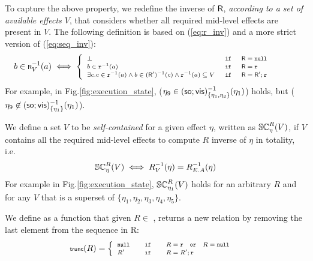 To capture the above property, we redefine the 
inverse of ${\normalfont \textsf{R}}$, \emph{according to a set of available effects $V$}, 
that considers whether all required mid-level effects are present in $V$.
The following definition is based on (\ref{eq:r_inv}) and a more
strict version of (\ref{eq:seq_inv}):
\begin{equation}
\label{eq:R_inv}
\scriptsize
b \in {\normalfont \textsf{R}}^{-1}_V(a) \iff
\begin{cases}
\begin{array} {lllll} 
\bot & \;\mathtt {if}\; & {\normalfont \textsf{R}} = \mathtt{null}& & \\
b \in \mathtt{r}^{-1}(a) & \;\mathtt {if}\; & {\normalfont \textsf{R}}=\mathtt{r} & & \\
\exists c. c \in
\mathtt{r}^{-1}(a) \wedge b \in ({\normalfont \textsf{R}}')^{-1}(c) \wedge
\mathtt{r}^{-1}(a) \subseteq V   & \;\mathtt {if}\; & {\normalfont \textsf{R}}={\normalfont \textsf{R}}';\mathtt{r} & & \;
\end{array}
\end{cases}
\end{equation}
For example, in Fig.\ref{fig:execution_state}, 
{\footnotesize  ($\eta_9 \in
({\textsf{so}};{\normalfont \textsf{vis}})_{\{\eta_1,\eta_3\}}^{-1}(\eta_1)$)}
holds, but {\footnotesize($\eta_9 \not\in ({\textsf{so}};{\normalfont \textsf{vis}})_{\{\eta_1\}}^{-1}(\eta_1)$)}. 

We define a set $V$ to be \emph{self-contained} for
a given effect $\eta$,
written as {\footnotesize $\SC
R \eta V$}, if $V$ contains all the required mid-level effects to compute
$R$ inverse of $\eta$ in totality, i.e.
\begin{equation}
\scriptsize 
\SC R \eta {V} \iff R^{-1}_V(\eta) = R^{-1}_{E.A}(\eta)
\end{equation}
For example in Fig.\ref{fig:execution_state}, {\footnotesize $\SC R
{\eta_1} V$} holds for an arbitrary  $R$ and for any $V$ that is a superset of
{\footnotesize $\{\eta_1,\eta_2,\eta_3,\eta_4,\eta_5\}$}.

We define {\footnotesize \trunc{}} as a function that
given  $R \in$ \relationS{}, 
returns a new relation by removing the last element from the sequence
in R:
\begin{equation}
\scriptsize
\trunc{R} = 
\begin{cases}
\begin{array}{lcl}
\nullR & \quad \myif \quad & R = \rel \quad \mathtt{or} \quad R = \nullR \\
R' & \quad \myif \quad & R = R';\rel 
\end{array}
\end{cases}
\end{equation}


